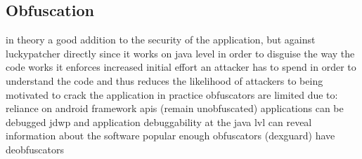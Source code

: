 \subsection{Obfuscation}
\label{subsection:evaluation-reengineering-optobf}

in theory a good addition to the security of the application, but against luckypatcher directly since it works on java level in order to disguise the way the code works
it enforces increased initial effort an attacker has to spend in order to understand the code and thus reduces the likelihood of attackers to being motivated to crack the application
in practice obfuscators are limited due to:
reliance on android framework apis (remain unobfuscated)
applications can be debugged
jdwp and application debuggability at the java lvl can reveal information about the software
popular enough obfuscators (dexguard) have deobfuscators
